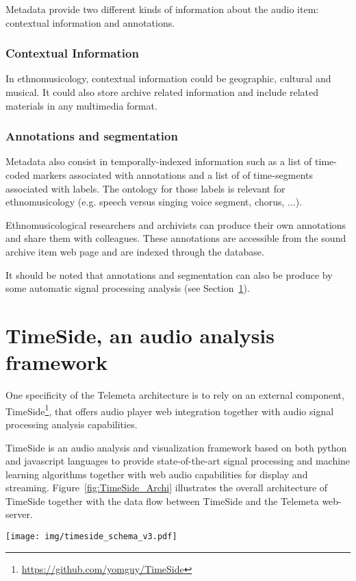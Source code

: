 \documentclass{paper}
\begin{document}
Metadata provide two different kinds of information about the audio item: contextual information and annotations.


\subsubsection{Contextual Information}
In ethnomusicology, contextual information could be geographic, cultural and musical. It could also store archive related information and include related materials in any multimedia format.

\subsubsection{Annotations and segmentation}
Metadata also consist in temporally-indexed information such as a list of time-coded markers associated with annotations and a list of of time-segments associated with labels. The ontology for those labels is relevant for ethnomusicology (e.g. speech versus singing voice segment, chorus, ...).

Ethnomusicological researchers and archivists can produce their own annotations and share them with colleagues. These annotations are accessible from the sound archive item web page and are indexed through the database.

It should be noted that annotations and segmentation can also be produce by some automatic signal processing analysis (see Section~\ref{sec:TimeSide}).


\section{TimeSide, an audio analysis framework}\label{sec:TimeSide}
One specificity of the Telemeta architecture is to rely on an external component, TimeSide\footnote{\url{https://github.com/yomguy/TimeSide}}, that offers audio player web integration together with audio signal processing analysis capabilities. 

TimeSide is an audio analysis and visualization framework based on both python and javascript languages to provide state-of-the-art signal processing and machine learning algorithms together with web audio capabilities for display and streaming.
Figure~\ref{fig:TimeSide_Archi} illustrates the overall architecture of TimeSide together with the data flow between TimeSide and the Telemeta web-server.

\begin{figure*}[htbp]
  \centering
  \texttt{[image: img/timeside\_schema\_v3.pdf]}
  \caption{TimeSide engine architecture and data flow with Telemeta web-server}\label{fig:TimeSide_Archi}
\end{figure*}
\end{document}
